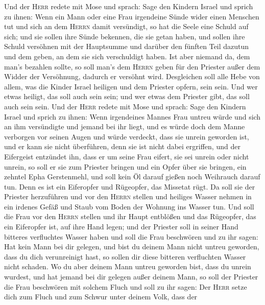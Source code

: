  Und der \textsc{Herr} redete mit Mose und sprach:
 Sage den Kindern Israel und sprich zu ihnen: Wenn ein
Mann oder eine Frau irgendeine Sünde wider einen Menschen tut und sich
an dem \textsc{Herrn} damit versündigt, so hat die Seele eine Schuld auf
sich;  und sie sollen ihre Sünde bekennen, die sie getan
haben, und sollen ihre Schuld versöhnen mit der Hauptsumme und darüber
den fünften Teil dazutun und dem geben, an dem sie sich verschuldigt
haben.  Ist aber niemand da, dem man's bezahlen sollte, so
soll man's dem \textsc{Herrn} geben für den Priester außer dem Widder
der Versöhnung, dadurch er versöhnt wird.  Desgleichen
soll alle Hebe von allem, was die Kinder Israel heiligen und dem
Priester opfern, sein sein.  Und wer etwas heiligt, das
soll auch sein sein; und wer etwas dem Priester gibt, das soll auch sein
sein.  Und der \textsc{Herr} redete mit Mose und sprach:
 Sage den Kindern Israel und sprich zu ihnen: Wenn
irgendeines Mannes Frau untreu würde und sich an ihm versündigte
 und jemand bei ihr liegt, und es würde doch dem Manne
verborgen vor seinen Augen und würde verdeckt, dass sie unrein geworden
ist, und er kann sie nicht überführen, denn sie ist nicht dabei
ergriffen,  und der Eifergeist entzündet ihn, dass er um
seine Frau eifert, sie sei unrein oder nicht unrein,  so
soll er sie zum Priester bringen und ein Opfer über sie bringen, ein
zehntel Epha Gerstenmehl, und soll kein Öl darauf gießen noch Weihrauch
darauf tun. Denn es ist ein Eiferopfer und Rügeopfer, das Missetat rügt.
 Da soll sie der Priester herzuführen und vor den
\textsc{Herrn} stellen  und heiliges Wasser nehmen in ein
irdenes Gefäß und Staub vom Boden der Wohnung ins Wasser tun.
 Und soll die Frau vor den \textsc{Herrn} stellen und ihr
Haupt entblößen und das Rügeopfer, das ein Eiferopfer ist, auf ihre Hand
legen; und der Priester soll in seiner Hand bitteres verfluchtes Wasser
haben  und soll die Frau beschwören und zu ihr sagen: Hat
kein Mann bei dir gelegen, und bist du deinem Mann nicht untreu
geworden, dass du dich verunreinigt hast, so sollen dir diese bitteren
verfluchten Wasser nicht schaden.  Wo du aber deinem Mann
untreu geworden bist, dass du unrein wurdest, und hat jemand bei dir
gelegen außer deinem Mann,  so soll der Priester die Frau
beschwören mit solchem Fluch und soll zu ihr sagen: Der \textsc{Herr}
setze dich zum Fluch und zum Schwur unter deinem Volk, dass der
